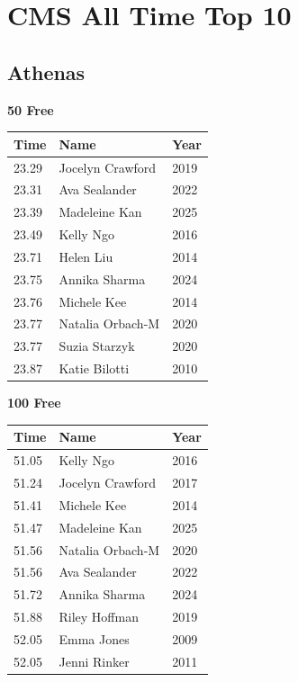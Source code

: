 
\clearpage
\section{CMS All Time Top 10}
\clearpage
\subsection{Athenas}
\vspace{1.2em}
\noindent\begin{minipage}[t]{0.48\textwidth}
\centering
\textbf{\textcolor{teamprimary}{50 Free}}\par
\vspace{0.5em}
\centering
\small
\renewcommand{\arraystretch}{1.0}
\setlength{\tabcolsep}{4pt}
\begin{tabular}{@{}p{1.8cm}p{3.0cm}p{1.0cm}@{}}
\toprule
\textbf{Time} & \textbf{Name} & \textbf{Year} \\
\midrule
23.29 & Jocelyn Crawford & 2019 \\
23.31 & Ava Sealander & 2022 \\
23.39 & Madeleine Kan & 2025 \\
23.49 & Kelly Ngo & 2016 \\
23.71 & Helen Liu & 2014 \\
23.75 & Annika Sharma & 2024 \\
23.76 & Michele Kee & 2014 \\
23.77 & Natalia Orbach-M & 2020 \\
23.77 & Suzia Starzyk & 2020 \\
23.87 & Katie Bilotti & 2010 \\
\bottomrule
\end{tabular}
\end{minipage}
\hfill
\begin{minipage}[t]{0.48\textwidth}
\centering
\textbf{\textcolor{teamprimary}{100 Free}}\par
\vspace{0.5em}
\centering
\small
\renewcommand{\arraystretch}{1.0}
\setlength{\tabcolsep}{4pt}
\begin{tabular}{@{}p{1.8cm}p{3.0cm}p{1.0cm}@{}}
\toprule
\textbf{Time} & \textbf{Name} & \textbf{Year} \\
\midrule
51.05 & Kelly Ngo & 2016 \\
51.24 & Jocelyn Crawford & 2017 \\
51.41 & Michele Kee & 2014 \\
51.47 & Madeleine Kan & 2025 \\
51.56 & Natalia Orbach-M & 2020 \\
51.56 & Ava Sealander & 2022 \\
51.72 & Annika Sharma & 2024 \\
51.88 & Riley Hoffman & 2019 \\
52.05 & Emma Jones & 2009 \\
52.05 & Jenni Rinker & 2011 \\
\bottomrule
\end{tabular}
\end{minipage}
